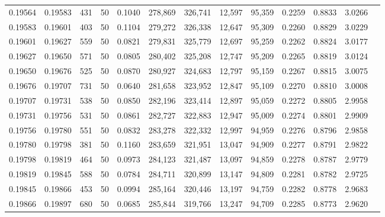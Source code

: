 \begin{tabular}{rrrrrrrrrrrrr}
0.19564 & 0.19583 &   431 &  50 &                                     0.1040 & 278,869 & 326,741 &  12,597 &  95,359 & 0.2259 & 0.8833 & 3.0266 \\
0.19583 & 0.19601 &   403 &  50 &                                     0.1104 & 279,272 & 326,338 &  12,647 &  95,309 & 0.2260 & 0.8829 & 3.0229 \\
0.19601 & 0.19627 &   559 &  50 &                                     0.0821 & 279,831 & 325,779 &  12,697 &  95,259 & 0.2262 & 0.8824 & 3.0177 \\
0.19627 & 0.19650 &   571 &  50 &                                     0.0805 & 280,402 & 325,208 &  12,747 &  95,209 & 0.2265 & 0.8819 & 3.0124 \\
0.19650 & 0.19676 &   525 &  50 &                                     0.0870 & 280,927 & 324,683 &  12,797 &  95,159 & 0.2267 & 0.8815 & 3.0075 \\
0.19676 & 0.19707 &   731 &  50 &                                     0.0640 & 281,658 & 323,952 &  12,847 &  95,109 & 0.2270 & 0.8810 & 3.0008 \\
0.19707 & 0.19731 &   538 &  50 &                                     0.0850 & 282,196 & 323,414 &  12,897 &  95,059 & 0.2272 & 0.8805 & 2.9958 \\
0.19731 & 0.19756 &   531 &  50 &                                     0.0861 & 282,727 & 322,883 &  12,947 &  95,009 & 0.2274 & 0.8801 & 2.9909 \\
0.19756 & 0.19780 &   551 &  50 &                                     0.0832 & 283,278 & 322,332 &  12,997 &  94,959 & 0.2276 & 0.8796 & 2.9858 \\
0.19780 & 0.19798 &   381 &  50 &                                     0.1160 & 283,659 & 321,951 &  13,047 &  94,909 & 0.2277 & 0.8791 & 2.9822 \\
0.19798 & 0.19819 &   464 &  50 &                                     0.0973 & 284,123 & 321,487 &  13,097 &  94,859 & 0.2278 & 0.8787 & 2.9779 \\
0.19819 & 0.19845 &   588 &  50 &                                     0.0784 & 284,711 & 320,899 &  13,147 &  94,809 & 0.2281 & 0.8782 & 2.9725 \\
0.19845 & 0.19866 &   453 &  50 &                                     0.0994 & 285,164 & 320,446 &  13,197 &  94,759 & 0.2282 & 0.8778 & 2.9683 \\
0.19866 & 0.19897 &   680 &  50 &                                     0.0685 & 285,844 & 319,766 &  13,247 &  94,709 & 0.2285 & 0.8773 & 2.9620 \\

\end{tabular}
